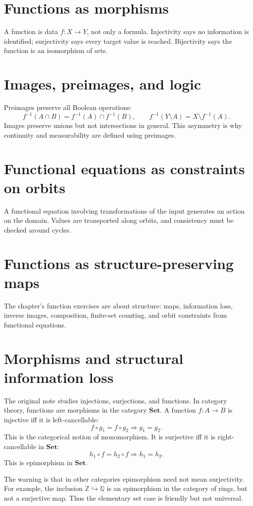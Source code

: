 \section{Functions as morphisms}
A function is data \(f:X\to Y\), not only a formula.  Injectivity says no information is identified; surjectivity says every target value is reached.  Bijectivity says the function is an isomorphism of sets.
\section{Images, preimages, and logic}
Preimages preserve all Boolean operations:
\[
f^{-1}(A\cap B)=f^{-1}(A)\cap f^{-1}(B),\qquad f^{-1}(Y\setminus A)=X\setminus f^{-1}(A).
\]
Images preserve unions but not intersections in general.  This asymmetry is why continuity and measurability are defined using preimages.
\section{Functional equations as constraints on orbits}
A functional equation involving transformations of the input generates an action on the domain.  Values are transported along orbits, and consistency must be checked around cycles.
\section{Functions as structure-preserving maps}
The chapter's function exercises are about structure: maps, information loss, inverse images, composition, finite-set counting, and orbit constraints from functional equations.

\section{Morphisms and structural information loss}

The original note studies injections, surjections, and functions.  In category theory, functions are morphisms in the category $\mathbf{Set}$.  A function $f:A\to B$ is injective iff it is left-cancellable:
\[
  f\circ g_1=f\circ g_2\Rightarrow g_1=g_2.
\]
This is the categorical notion of monomorphism.  It is surjective iff it is right-cancellable in $\mathbf{Set}$:
\[
  h_1\circ f=h_2\circ f\Rightarrow h_1=h_2.
\]
This is epimorphism in $\mathbf{Set}$.

The warning is that in other categories epimorphism need not mean surjectivity.  For example, the inclusion $\mathbb Z\hookrightarrow \mathbb Q$ is an epimorphism in the category of rings, but not a surjective map.  Thus the elementary set case is friendly but not universal.

